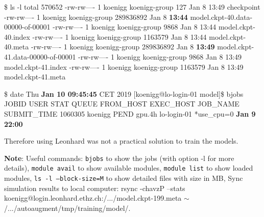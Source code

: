 \documentclass[10pt,twocolumn,letterpaper]{article}
\begin{document}
\$ ls -l
total 570652
-rw-rw---- 1 koenigg koenigg-group       127 Jan  8 13:49 checkpoint
-rw-rw---- 1 koenigg koenigg-group 289836892 Jan  8 \textbf{13:44} model.ckpt-40.data-00000-of-00001
-rw-rw---- 1 koenigg koenigg-group      9868 Jan  8 13:44 model.ckpt-40.index
-rw-rw---- 1 koenigg koenigg-group   1163579 Jan  8 13:44 model.ckpt-40.meta
-rw-rw---- 1 koenigg koenigg-group 289836892 Jan  8 \textbf{13:49} model.ckpt-41.data-00000-of-00001
-rw-rw---- 1 koenigg koenigg-group      9868 Jan  8 13:49 model.ckpt-41.index
-rw-rw---- 1 koenigg koenigg-group   1163579 Jan  8 13:49 model.ckpt-41.meta \newline

\$ date
Thu \textbf{Jan 10 09:45:45} CET 2019
[koenigg@lo-login-01 model]\$ bjobs
JOBID USER STAT QUEUE FROM\_HOST EXEC\_HOST JOB\_NAME SUBMIT\_TIME 1060305 koenigg PEND gpu.4h lo-login-01 *use\_cpu=0 \textbf{Jan  9 22:00}\newline

Therefore using Leonhard was not a practical solution to train the models.\newline

\noindent
\textbf{Note}: Useful commands: \texttt{bjobs} to show the jobs (with option -l for more details), \texttt{module avail} to show available modules, \texttt{module list} to show loaded modules, \texttt{ls -l --block-size=M} to show detailed files with size in MB, Sync simulation results to local computer: rsync -chavzP --stats koenigg@login.leonhard.ethz.ch:/.../model.ckpt-199.meta $\sim$/.../autoaugment/tmp/training/model/. \newline
\end{document}

